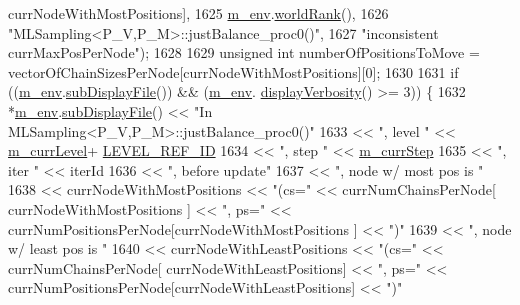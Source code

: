 \begin{DoxyCode}
      currNodeWithMostPositions],
1625                         \hyperlink{class_q_u_e_s_o_1_1_m_l_sampling_a13f1ca4fe9f94822fe572a743eaced1d}{m\_env}.\hyperlink{class_q_u_e_s_o_1_1_base_environment_a78b57112bbd0e6dd0e8afec00b40ffa7}{worldRank}(),
1626                         \textcolor{stringliteral}{"MLSampling<P\_V,P\_M>::justBalance\_proc0()"},
1627                         \textcolor{stringliteral}{"inconsistent currMaxPosPerNode"});
1628 
1629     \textcolor{keywordtype}{unsigned} \textcolor{keywordtype}{int} numberOfPositionsToMove = vectorOfChainSizesPerNode[currNodeWithMostPositions][0];
1630 
1631     \textcolor{keywordflow}{if} ((\hyperlink{class_q_u_e_s_o_1_1_m_l_sampling_a13f1ca4fe9f94822fe572a743eaced1d}{m\_env}.\hyperlink{class_q_u_e_s_o_1_1_base_environment_a8a0064746ae8dddfece4229b9ad374d6}{subDisplayFile}()) && (\hyperlink{class_q_u_e_s_o_1_1_m_l_sampling_a13f1ca4fe9f94822fe572a743eaced1d}{m\_env}.
      \hyperlink{class_q_u_e_s_o_1_1_base_environment_a1fe5f244fc0316a0ab3e37463f108b96}{displayVerbosity}() >= 3)) \{
1632       *\hyperlink{class_q_u_e_s_o_1_1_m_l_sampling_a13f1ca4fe9f94822fe572a743eaced1d}{m\_env}.\hyperlink{class_q_u_e_s_o_1_1_base_environment_a8a0064746ae8dddfece4229b9ad374d6}{subDisplayFile}() << \textcolor{stringliteral}{"In MLSampling<P\_V,P\_M>::justBalance\_proc0()"}
1633                               << \textcolor{stringliteral}{", level "} << \hyperlink{class_q_u_e_s_o_1_1_m_l_sampling_af9416874c856e50f3b35270e801f17e4}{m\_currLevel}+
      \hyperlink{_m_l_sampling_level_options_8h_a68d15eaf394d210effcf584b938206d3}{LEVEL\_REF\_ID}
1634                               << \textcolor{stringliteral}{", step "}  << \hyperlink{class_q_u_e_s_o_1_1_m_l_sampling_a1b1f8ccb4823bdfa26ec652f0807c63e}{m\_currStep}
1635                               << \textcolor{stringliteral}{", iter "}  << iterId
1636                               << \textcolor{stringliteral}{", before update"}
1637                               << \textcolor{stringliteral}{", node w/ most pos is "}
1638                               << currNodeWithMostPositions  << \textcolor{stringliteral}{"(cs="} << currNumChainsPerNode[
      currNodeWithMostPositions ] << \textcolor{stringliteral}{", ps="} << currNumPositionsPerNode[currNodeWithMostPositions ] << \textcolor{stringliteral}{")"}
1639                               << \textcolor{stringliteral}{", node w/ least pos is "}
1640                               << currNodeWithLeastPositions << \textcolor{stringliteral}{"(cs="} << currNumChainsPerNode[
      currNodeWithLeastPositions] << \textcolor{stringliteral}{", ps="} << currNumPositionsPerNode[currNodeWithLeastPositions] << \textcolor{stringliteral}{")"}

\end{DoxyCode}
